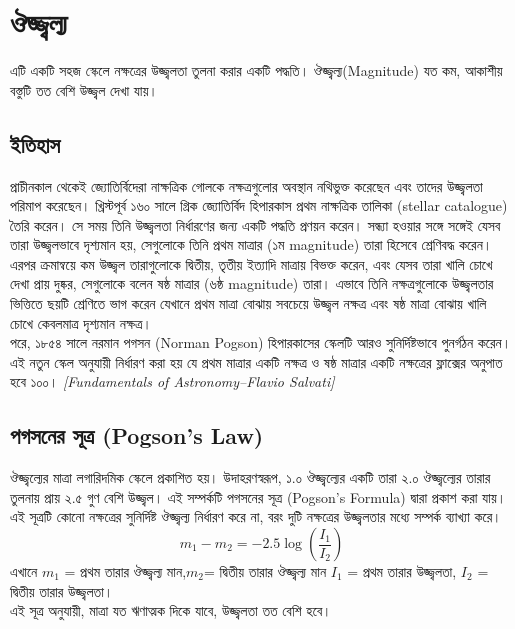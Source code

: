 \documentclass{article}
\begin{document}
\section{\bn  ঔজ্জ্বল্য}
{\bn এটি একটি সহজ স্কেলে নক্ষত্রের উজ্জ্বলতা তুলনা করার একটি পদ্ধতি। ঔজ্জ্বল্য(Magnitude) যত কম, আকাশীয় বস্তুটি তত বেশি উজ্জ্বল দেখা যায়।}
\subsection{\bn  ইতিহাস}
{\bn প্রাচীনকাল থেকেই জ্যোতির্বিদেরা নাক্ষত্রিক গোলকে নক্ষত্রগুলোর অবস্থান নথিভুক্ত করেছেন এবং তাদের উজ্জ্বলতা পরিমাপ করেছেন।
খ্রিস্টপূর্ব ১৬০ সালে গ্রিক জ্যোতির্বিদ হিপারকাস প্রথম নাক্ষত্রিক তালিকা (stellar catalogue) তৈরি করেন।
সে সময় তিনি উজ্জ্বলতা নির্ধারণের জন্য একটি পদ্ধতি প্রণয়ন করেন। সন্ধ্যা হওয়ার সঙ্গে সঙ্গেই যেসব তারা উজ্জ্বলভাবে দৃশ্যমান হয়, সেগুলোকে তিনি প্রথম মাত্রার (১ম magnitude) তারা হিসেবে শ্রেণিবদ্ধ করেন। এরপর ক্রমান্বয়ে কম উজ্জ্বল তারাগুলোকে দ্বিতীয়, তৃতীয় ইত্যাদি মাত্রায় বিভক্ত করেন, এবং যেসব তারা খালি চোখে দেখা প্রায় দুষ্কর, সেগুলোকে বলেন ষষ্ঠ মাত্রার (৬ষ্ঠ magnitude) তারা।
এভাবে তিনি নক্ষত্রগুলোকে উজ্জ্বলতার ভিত্তিতে ছয়টি শ্রেণিতে ভাগ করেন যেখানে প্রথম মাত্রা বোঝায় সবচেয়ে উজ্জ্বল নক্ষত্র এবং ষষ্ঠ মাত্রা বোঝায় খালি চোখে কেবলমাত্র দৃশ্যমান নক্ষত্র।
\\
পরে, ১৮৫৪ সালে নরমান পগসন (Norman Pogson) হিপারকাসের স্কেলটি আরও সুনির্দিষ্টভাবে পুনর্গঠন করেন। এই নতুন স্কেল অনুযায়ী নির্ধারণ করা হয় যে প্রথম মাত্রার একটি নক্ষত্র ও ষষ্ঠ মাত্রার একটি নক্ষত্রের ফ্লাক্সের অনুপাত হবে ১০০।} \textit{[Fundamentals of Astronomy–Flavio Salvati]}
\subsection{\bn  পগসনের সূত্র (Pogson’s Law)}
{\bn
ঔজ্জ্বল্যের মাত্রা লগারিদমিক স্কেলে প্রকাশিত হয়। উদাহরণস্বরূপ, ১.০ ঔজ্জ্বল্যের একটি তারা ২.০ ঔজ্জ্বল্যের তারার তুলনায় প্রায় ২.৫ গুণ বেশি উজ্জ্বল।
এই সম্পর্কটি পগসনের সূত্র (Pogson’s Formula) দ্বারা প্রকাশ করা যায়।
এই সূত্রটি কোনো নক্ষত্রের সুনির্দিষ্ট ঔজ্জ্বল্য নির্ধারণ করে না, বরং দুটি নক্ষত্রের উজ্জ্বলতার মধ্যে সম্পর্ক ব্যাখ্যা করে। }
$$m_1 - m_2 = -2.5 \log(\frac{I_1}{I_2})$$
{\bn এখানে } $m_1$ {\bn = প্রথম তারার ঔজ্জ্বল্য মান,}$m_2${\bn = দ্বিতীয় তারার ঔজ্জ্বল্য মান}
$I_1$ {\bn = প্রথম তারার উজ্জ্বলতা,}  $I_2$ {\bn = দ্বিতীয় তারার উজ্জ্বলতা। }
\\
{\bn এই সূত্র অনুযায়ী, মাত্রা যত ঋণাত্মক দিকে যাবে, উজ্জ্বলতা তত বেশি হবে।}
\end{document}
